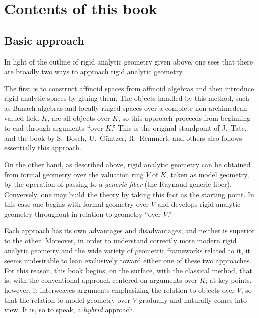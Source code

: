\documentclass[a4paper,12pt, dvipdfmx]{jsbook}
\theoremstyle{plain}
\theoremstyle{definition}
\begin{document}
\section{Contents of this book}\label{sec-contents}
\subsection{Basic approach}\label{sub-blueprint}
In light of the outline of rigid analytic geometry given above, one sees that there are broadly two ways to approach rigid analytic geometry.

The first is to construct affinoid spaces from affinoid algebras and then introduce rigid analytic spaces by gluing them.
The objects handled by this method, such as Banach algebras and locally ringed spaces over a complete non-archimedean valued field $K$, are all objects over $K$, so this approach proceeds from beginning to end through arguments ``over $K$.''
This is the original standpoint of J.\ Tate, and the book \cite{BGR} by S.\ Bosch, U.\ G\"untzer, R.\ Remmert, and others also follows essentially this approach.

On the other hand, as described above, rigid analytic geometry can be obtained from formal geometry over the valuation ring $V$ of $K$, taken as model geometry, by the operation of passing to a {\it generic fiber} (the Raynaud generic fiber). Conversely, one may build the theory by taking this fact as the starting point.
In this case one begins with formal geometry over $V$ and develops rigid analytic geometry throughout in relation to geometry ``over $V$.''

Each approach has its own advantages and disadvantages, and neither is superior to the other.
Moreover, in order to understand correctly more modern rigid analytic geometry and the wide variety of geometric frameworks related to it, it seems undesirable to lean exclusively toward either one of these two approaches.
For this reason, this book begins, on the surface, with the classical method, that is, with the conventional approach centered on arguments over $K$; at key points, however, it interweaves arguments emphasizing the relation to objects over $V$, so that the relation to model geometry over $V$ gradually and naturally comes into view.
It is, so to speak, a {\it hybrid} approach.
\end{document}

